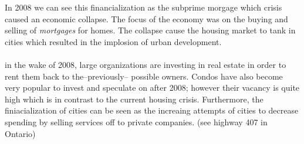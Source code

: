 \documentclass[12pt]{book}
\begin{document}
In 2008 we can see this financialization as the subprime morgage which crisis caused an economic collapse.
The focus of the economy was on the buying and selling of \textit{mortgages} for homes. 
The collapse cause the housing market to tank in cities which resulted in the implosion of urban development.

\paragraph{}
in the wake of 2008, large organizations are investing in real estate in order to rent them back to the--previously--
possible owners.
Condos have also become very popular to invest and speculate on after 2008; however their vacancy is quite high
which is in contrast to the current housing crisis.
Furthermore, the finiacialization of cities can be seen as the increaing attempts of cities to decrease spending
by selling services off to private companies. (see highway 407 in Ontario)
\end{document}
